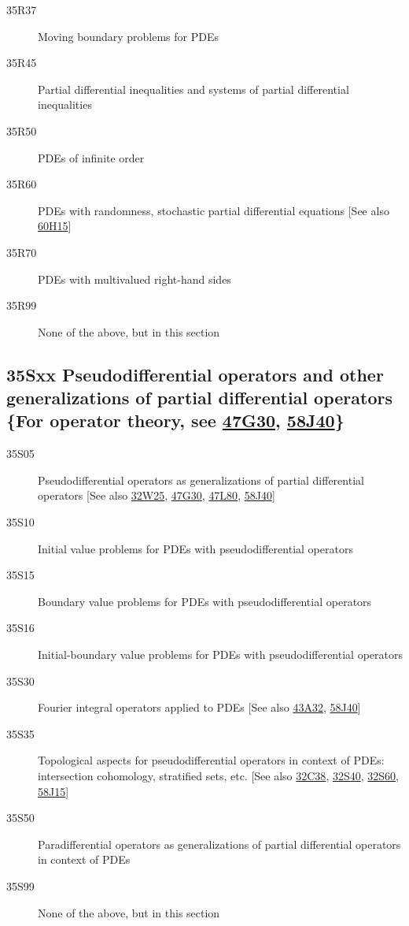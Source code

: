 \begin{description}
\item [35R37]\label{35R37} Moving boundary problems for PDEs
\item [35R45]\label{35R45} Partial differential inequalities and systems of  partial differential inequalities
\item [35R50]\label{35R50} PDEs of infinite order
\item [35R60]\label{35R60} PDEs with randomness, stochastic partial differential equations [See also \hyperref[60H15]{60H15}]
\item [35R70]\label{35R70} PDEs with multivalued right-hand sides
\item [35R99]\label{35R99} None of the above, but in this section
\end{description}
\subsection*{35Sxx  Pseudodifferential operators and other generalizations of partial differential operators \{For operator theory, see \hyperref[47G30]{47G30}, \hyperref[58J40]{58J40}\} }\label{35Sxx}
\begin{description}  
\item [35S05]\label{35S05} Pseudodifferential operators as generalizations of partial differential operators [See also \hyperref[32W25]{32W25}, \hyperref[47G30]{47G30}, \hyperref[47L80]{47L80}, \hyperref[58J40]{58J40}]
\item [35S10]\label{35S10} Initial value problems for PDEs with pseudodifferential operators
\item [35S15]\label{35S15} Boundary value problems for PDEs with pseudodifferential operators
\item [35S16]\label{35S16} Initial-boundary value problems for PDEs with pseudodifferential operators
\item [35S30]\label{35S30} Fourier integral operators applied to PDEs  [See also \hyperref[43A32]{43A32}, \hyperref[58J40]{58J40}]
\item [35S35]\label{35S35} Topological aspects for pseudodifferential operators in context of PDEs: intersection cohomology, stratified sets, etc. [See also \hyperref[32C38]{32C38}, \hyperref[32S40]{32S40}, \hyperref[32S60]{32S60}, \hyperref[58J15]{58J15}]
\item [35S50]\label{35S50} Paradifferential operators as generalizations of partial differential operators in context of PDEs 
\item [35S99]\label{35S99} None of the above, but in this section
\end{description}
